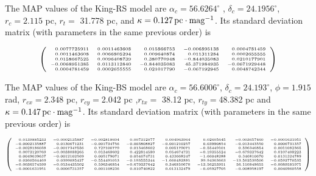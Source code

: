The MAP values of the King-RS model are $\alpha_c=56.6264^{\circ}$ , $\delta_c=24.1956^{\circ}$, $r_{c}=2.115$ pc, $r_{t}=$ 31.778 pc, and $\kappa= 0.127\, \rm{pc \cdot mag^{-1}}$. Its standard deviation matrix (with parameters in the same previous order) is

$$
\tiny
\left(\begin{array}{rrrrr}
0.0077725911  & 0.0011463608 & 0.015866753 & -0.006895138 &0.0004781459\\
0.0011463608  & 0.0066805294 & 0.009640874 &  0.011311284  &0.0002655555\\
0.0158667525  & 0.0096408739 & 0.380770948& -0.844035083  & 0.0210177901\\
-0.0068951385 & 0.0113112840 & -0.844035083& 45.371984935&-0.0671929448\\
0.0004781459  & 0.0002655555 & 0.021017790& -0.067192945  &  0.0048742344\\
\end{array}\right)
$$

The MAP values of the King-BS model are $\alpha_c=56.6006^{\circ}$, $\delta_c=24.193^{\circ}$, $\phi=1.915$ rad, $r_{cx}=2.348$ pc, $r_{cy}=$2.042 pc ,$r_{tx}=$ 38.12 pc, $r_{ty}=$48.382 pc  and $\kappa= 0.147\, \rm{pc \cdot mag^{-1}}$. Its standard deviation matrix (with parameters in the same previous order) is

$$
\tiny
\left(\begin{array}{rrrrrrrr}
0.0139885233 	 &  -0.0002135887  &-0.002818604  & 0.007312077     &0.004963964   &  0.02605645     &-0.003657460      &-0.0001631951\\
-0.0002135887 	 &  0.0130671231   &-0.001734756   & -0.003808827   &-0.001210257  &  0.03990854     &-0.013443550      &0.0006731357     \\        
-0.0028186038 	 & -0.0017347556   & 0.727100779   & 0.013468602    &0.005179071    & -0.55449101    & 0.596346854      &0.0011082365      \\           
0.0073120769 	 &   -0.0038088265 &  0.013468602  &  0.422814580   &0.054674731    & -0.19355524    & -0.679337642     & 0.0107408223     \\  
0.0049639637 	 &   -0.0012102569 &  0.005179071  &  0.054674731   &0.433668247    & -1.66048288    & 0.346810670      & 0.0131324789     \\      
0.0260564469 	 &   0.0399085427  & -0.554491013  &  -0.193555244  & -1.660482881 &  89.94363663   & -13.562539506   & -0.0592770535   \\        
-0.0036574599 	 &  -0.0134435502  &  0.596346854  & -0.679337642   & 0.346810670  &  -13.56253951  &   56.110848655  &  -0.0089581971   \\          
-0.0001631951 	 &   0.0006731357  & 0.001108236   & 0.010740822    & 0.013132479   &   -0.05927705  &    -0.008958197  &   0.0040960558    \\
\end{array}\right)
$$


